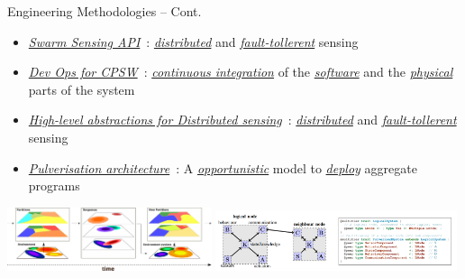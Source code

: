 \documentclass[presentation, 9pt]{beamer}\mode<presentation>{\usetheme{AMSBolognaFC}}
\begin{document}
\begin{frame}{Engineering Methodologies -- Cont.}
  \begin{itemize}
    \item \emph{\underline{Swarm Sensing API}}~\cite{swarm-clustering}: \emph{\underline{distributed}} and \emph{\underline{fault-tollerent}} sensing
    \item \emph{\underline{Dev Ops for CPSW}}~\cite{casadei2022towards}: \emph{\underline{continuous integration}} of the \emph{\underline{software}} and the \emph{\underline{physical}} parts of the system
    \item \emph{\underline{High-level abstractions for Distributed sensing}}~\cite{aguzzi2022dynamic}: \emph{\underline{distributed}} and \emph{\underline{fault-tollerent}} sensing
    \item \emph{\underline{Pulverisation architecture}}~\cite{aguzzi2021towards}: A \emph{\underline{opportunistic}} model to \emph{\underline{deploy}} aggregate programs
  \end{itemize}
  \vspace{0.5cm}
  \includegraphics[width=0.45\textwidth]{img/action-with-multilayer.pdf}
  \includegraphics[width=0.53\textwidth]{img/screenshot.png}
  
\end{frame}
\end{document}
